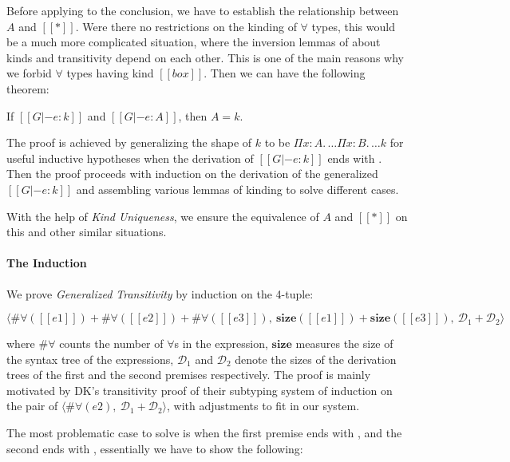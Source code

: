 \noindent Before applying  to the conclusion,
we have to establish the relationship between $A$ and $[[*]]$.
Were there no restrictions on the kinding of $\forall$ types,
this would be a much more complicated situation, where the inversion lemmas of
about kinds and transitivity depend on each other.
This is one of the main reasons why we forbid $\forall$ types having kind $[[box]]$.
Then we can have the following theorem:

\begin{theorem}
    If $[[G |- e : k]]$ and $[[G |- e : A]]$,
    then $A = k$.
\end{theorem}

\noindent The proof is achieved by generalizing the shape of $k$ to be
$\Pi x : A.\, \dots \Pi x : B.\, \dots k$ for useful inductive hypotheses
when the derivation of $[[G |- e : k]]$ ends with . Then the proof
proceeds with induction on the derivation of the generalized $[[G |- e : k]]$ and
assembling various lemmas of kinding to solve different cases.

With the help of \emph{Kind Uniqueness},
we ensure the equivalence of $A$ and $[[*]]$ on this and other similar situations.

\paragraph{The Induction}

We prove \emph{Generalized Transitivity} by induction on the 4-tuple:

$$
\langle \#\forall([[e1]]) + \#\forall([[e2]]) + \#\forall([[e3]]), ~
\mathbf{size}([[e1]]) + \mathbf{size}([[e3]]), ~
\mathcal{D}_1 + \mathcal{D}_2 \rangle
$$

\noindent where $\#\forall$ counts the number of $\forall$s in the expression,
$\mathbf{size}$ measures the size of the syntax tree of the expressions,
$\mathcal{D}_1$ and $\mathcal{D}_2$ denote the sizes of the derivation trees of
the first and the second premises respectively.
The proof is mainly motivated by DK's transitivity proof of their subtyping
system of induction on the pair of
$\langle \#\forall(e2) ,~ \mathcal{D}_1 + \mathcal{D}_2 \rangle$\cite{dunfield2013lemmas},
with adjustments to fit in our system.

The most problematic case to solve is when the first premise ends with ,
and the second ends with , essentially we have to show the following:

